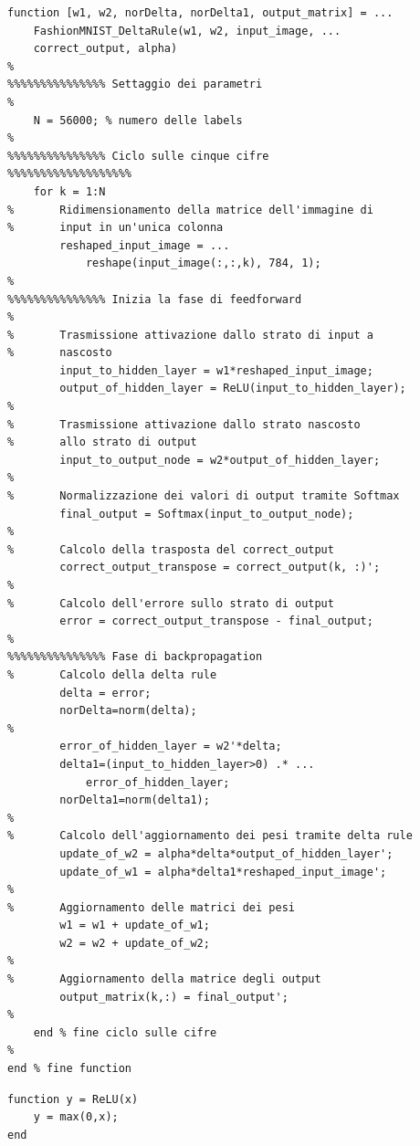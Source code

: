 \documentclass[a4paper,12pt]{article}
\begin{document}
\newpage
\begin{lstlisting}[style=Matlab-editor,title=\texttt{FashionMNIST\_DeltaRule.m},label=lst:deltarule]
function [w1, w2, norDelta, norDelta1, output_matrix] = ...
    FashionMNIST_DeltaRule(w1, w2, input_image, ... 
    correct_output, alpha)
%
%%%%%%%%%%%%%%% Settaggio dei parametri
%
    N = 56000; % numero delle labels
%
%%%%%%%%%%%%%%% Ciclo sulle cinque cifre
%%%%%%%%%%%%%%%%%%%
    for k = 1:N
%       Ridimensionamento della matrice dell'immagine di 
%       input in un'unica colonna
        reshaped_input_image = ... 
            reshape(input_image(:,:,k), 784, 1);
%
%%%%%%%%%%%%%%% Inizia la fase di feedforward
%
%       Trasmissione attivazione dallo strato di input a
%       nascosto
        input_to_hidden_layer = w1*reshaped_input_image;
        output_of_hidden_layer = ReLU(input_to_hidden_layer);
%
%       Trasmissione attivazione dallo strato nascosto
%       allo strato di output
        input_to_output_node = w2*output_of_hidden_layer;
%
%       Normalizzazione dei valori di output tramite Softmax
        final_output = Softmax(input_to_output_node);
%
%       Calcolo della trasposta del correct_output
        correct_output_transpose = correct_output(k, :)';
%
%       Calcolo dell'errore sullo strato di output
        error = correct_output_transpose - final_output;
%
%%%%%%%%%%%%%%% Fase di backpropagation
%       Calcolo della delta rule
        delta = error;
        norDelta=norm(delta);
%
        error_of_hidden_layer = w2'*delta;
        delta1=(input_to_hidden_layer>0) .* ... 
            error_of_hidden_layer;
        norDelta1=norm(delta1);
%
%       Calcolo dell'aggiornamento dei pesi tramite delta rule
        update_of_w2 = alpha*delta*output_of_hidden_layer';
        update_of_w1 = alpha*delta1*reshaped_input_image';
%
%       Aggiornamento delle matrici dei pesi
        w1 = w1 + update_of_w1;
        w2 = w2 + update_of_w2;
%
%       Aggiornamento della matrice degli output
        output_matrix(k,:) = final_output';
%
    end % fine ciclo sulle cifre
%
end % fine function
\end{lstlisting}

\vspace{2cm}

\begin{lstlisting}[style=Matlab-editor,title=\texttt{ReLU.mat}]
function y = ReLU(x)
    y = max(0,x);
end
\end{lstlisting}

\vspace{2cm}
\end{document}
